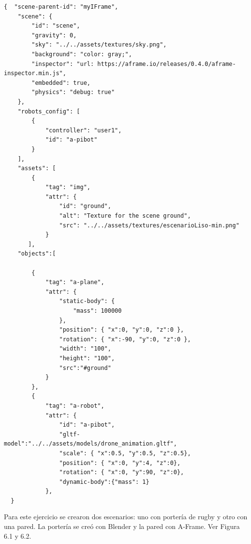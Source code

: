 \begin{lstlisting}
{  "scene-parent-id": "myIFrame",
    "scene": {
        "id": "scene",
        "gravity": 0,
        "sky": "../../assets/textures/sky.png",
        "background": "color: gray;",
        "inspector": "url: https://aframe.io/releases/0.4.0/aframe-inspector.min.js",
        "embedded": true,
        "physics": "debug: true"
    },
    "robots_config": [
        {
            "controller": "user1",
            "id": "a-pibot"
        }
    ],
    "assets": [
        {
            "tag": "img",
            "attr": {
                "id": "ground",
                "alt": "Texture for the scene ground",
                "src": "../../assets/textures/escenarioLiso-min.png"
            }
       ],
    "objects":[
     
        {
            "tag": "a-plane",
            "attr": {
                "static-body": {
                    "mass": 100000
                },
                "position": { "x":0, "y":0, "z":0 },
                "rotation": { "x":-90, "y":0, "z":0 },
                "width": "100",
                "height": "100",
                "src":"#ground"
            }
        },
        {
            "tag": "a-robot",
            "attr": {
                "id": "a-pibot",
                "gltf-model":"../../assets/models/drone_animation.gltf",
                "scale": { "x":0.5, "y":0.5, "z":0.5},
                "position": { "x":0, "y":4, "z":0},
                "rotation": { "x":0, "y":90, "z":0},
                "dynamic-body":{"mass": 1}
            },      
  }
\end{lstlisting}


Para este ejercicio se crearon dos escenarios: uno con portería de rugby y otro con una pared. La portería se creó con Blender y la pared con A-Frame. Ver Figura 6.1 y 6.2.

